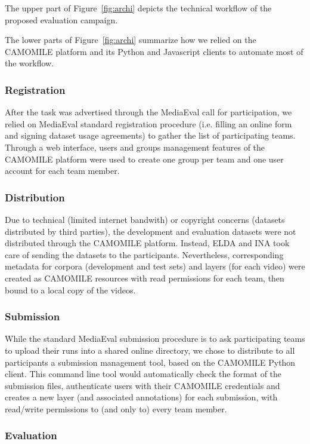 \documentclass[10pt, a4paper]{article}
\begin{document}
The upper part of Figure~\ref{fig:archi} depicts the technical workflow of the proposed
evaluation campaign.

The lower parts of Figure~\ref{fig:archi} summarize how we relied on the CAMOMILE platform
and its Python and Javascript clients to automate most of the workflow.

\subsubsection{Registration}

After the task was advertised through the MediaEval call for
participation, we relied on MediaEval standard registration procedure (i.e.
filling an online form and signing dataset usage agreements) to gather the list
of participating teams. Through a web interface, users and groups management
features of the CAMOMILE platform were used to create one group per team and
one user account for each team member.

\subsubsection{Distribution}

Due to technical (limited internet bandwith) or copyright
concerns (datasets distributed by third parties), the development and
evaluation datasets were not distributed through the CAMOMILE platform.
Instead, ELDA and INA took care of sending the datasets to the participants.
Nevertheless, corresponding metadata for corpora (development and test sets)
and layers (for each video) were created as CAMOMILE resources with read
permissions for each team, then bound to a local copy of the videos.

\subsubsection{Submission}

While the standard MediaEval submission procedure is to ask
participating teams to upload their runs into a shared online directory, we
chose to distribute to all participants a submission management tool, based on
the CAMOMILE Python client. This command line tool would automatically check
the format of the submission files, authenticate users with their CAMOMILE
credentials and creates a new layer (and associated annotations) for each
submission, with read/write permissions to (and only to) every team member.

\subsubsection{Evaluation}
\end{document}

